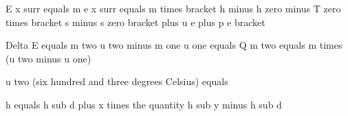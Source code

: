 E x surr equals m e x surr equals m times bracket h minus h zero minus T zero times bracket s minus s zero bracket plus u e plus p e bracket

Delta E equals m two u two minus m one u one equals Q m two equals m times (u two minus u one)

u two (six hundred and three degrees Celsius) equals

h equals h sub d plus x times the quantity h sub y minus h sub d
